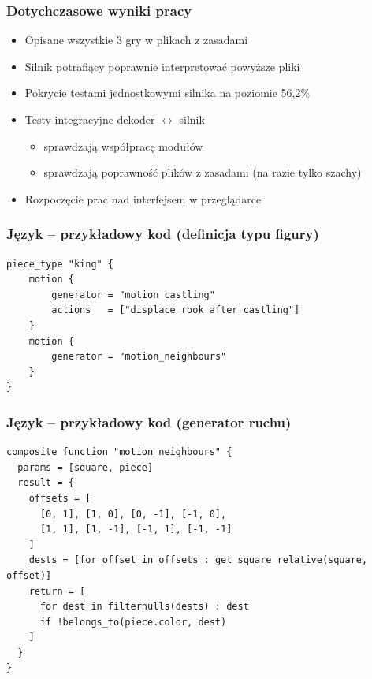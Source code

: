 \documentclass{beamer}
\begin{document}
\begin{frame}
	\frametitle{Dotychczasowe wyniki pracy}
	\begin{itemize}
		\item Opisane wszystkie 3 gry w plikach z zasadami
		\item Silnik potrafiący poprawnie interpretować powyższe pliki
		\item Pokrycie testami jednostkowymi silnika na poziomie 56,2\%
		\item Testy integracyjne dekoder $\leftrightarrow$ silnik
		      \begin{itemize}
			      \item sprawdzają współpracę modułów
			      \item sprawdzają poprawność plików z zasadami (na razie tylko szachy)
		      \end{itemize}
		\item Rozpoczęcie prac nad interfejsem w przeglądarce
	\end{itemize}
\end{frame}

\begin{frame}[fragile]
	\frametitle{Język -- przykładowy kod (definicja typu figury)}

	\begin{lstlisting}
piece_type "king" {
	motion {
		generator = "motion_castling"
		actions   = ["displace_rook_after_castling"]
	}
	motion {
		generator = "motion_neighbours"
	}
}
	\end{lstlisting}
\end{frame}

\begin{frame}[fragile]
	\frametitle{Język -- przykładowy kod (generator ruchu)}

	\begin{lstlisting}
composite_function "motion_neighbours" {
  params = [square, piece]
  result = {
    offsets = [
      [0, 1], [1, 0], [0, -1], [-1, 0],
      [1, 1], [1, -1], [-1, 1], [-1, -1]
    ]
    dests = [for offset in offsets : get_square_relative(square, offset)]
    return = [
      for dest in filternulls(dests) : dest
      if !belongs_to(piece.color, dest)
    ]
  }
}
	\end{lstlisting}
\end{frame}
\end{document}
